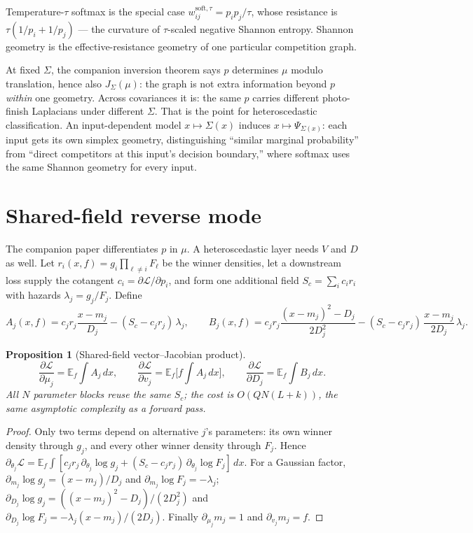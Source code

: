 \documentclass[11pt]{article}
\newtheorem{proposition}{Proposition}
\theoremstyle{remark}
\newcommand{\E}{\mathbb{E}}
\begin{document}
Temperature-$\tau$ softmax is the special case $w^{\mathrm{soft},\tau}_{ij}
= p_i p_j / \tau$, whose resistance is $\tau(1/p_i + 1/p_j)$ --- the
curvature of $\tau$-scaled negative Shannon entropy. Shannon geometry
is the effective-resistance geometry of one particular competition
graph.

At fixed $\Sigma$, the companion inversion theorem says $p$ determines
$\mu$ modulo translation, hence also $J_\Sigma(\mu)$: the graph is not
extra information beyond $p$ \emph{within} one geometry. Across
covariances it is: the same $p$ carries different photo-finish
Laplacians under different $\Sigma$. That is the point for
heteroscedastic classification. An input-dependent model $x \mapsto
\Sigma(x)$ induces $x \mapsto \Psi_{\Sigma(x)}$: each input gets its own
simplex geometry, distinguishing ``similar marginal probability'' from
``direct competitors at this input's decision boundary,'' where softmax
uses the same Shannon geometry for every input.

\section{Shared-field reverse mode}\label{sec:reverse}

The companion paper differentiates $p$ in $\mu$. A heteroscedastic
layer needs $V$ and $D$ as well. Let $r_i(x, f) = g_i \prod_{\ell \ne
i} F_\ell$ be the winner densities, let a downstream loss supply the
cotangent $c_i = \partial \mathcal{L}/\partial p_i$, and form one
additional field $S_c = \sum_i c_i r_i$ with hazards $\lambda_j = g_j /
F_j$. Define
\[
A_j(x, f) = c_j r_j \frac{x - m_j}{D_j} - (S_c - c_j r_j)\, \lambda_j ,
\qquad
B_j(x, f) = c_j r_j \frac{(x - m_j)^2 - D_j}{2 D_j^2}
- (S_c - c_j r_j)\, \frac{x - m_j}{2 D_j}\, \lambda_j .
\]

\begin{proposition}[Shared-field vector--Jacobian product]
\label{prop:vjp}
\[
\frac{\partial \mathcal{L}}{\partial \mu_j} = \E_f \int A_j \, dx,
\qquad
\frac{\partial \mathcal{L}}{\partial v_j} = \E_f \Big[ f \int A_j \,
dx \Big], \qquad
\frac{\partial \mathcal{L}}{\partial D_j} = \E_f \int B_j \, dx .
\]
All $N$ parameter blocks reuse the same $S_c$; the cost is
$O(QN(L + k))$, the same asymptotic complexity as a forward pass.
\end{proposition}

\begin{proof}
Only two terms depend on alternative $j$'s parameters: its own winner
density through $g_j$, and every other winner density through $F_j$.
Hence $\partial_{\theta_j} \mathcal{L} = \E_f \int [ c_j r_j\,
\partial_{\theta_j} \log g_j + (S_c - c_j r_j)\, \partial_{\theta_j}
\log F_j ]\, dx$. For a Gaussian factor, $\partial_{m_j} \log g_j = (x
- m_j)/D_j$ and $\partial_{m_j} \log F_j = -\lambda_j$;
$\partial_{D_j} \log g_j = ((x-m_j)^2 - D_j)/(2 D_j^2)$ and
$\partial_{D_j} \log F_j = -\lambda_j (x - m_j)/(2 D_j)$. Finally
$\partial_{\mu_j} m_j = 1$ and $\partial_{v_j} m_j = f$.
\end{proof}
\end{document}
